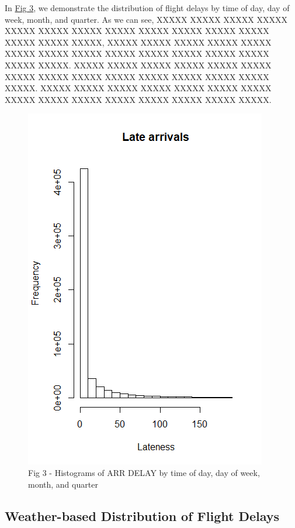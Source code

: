 \documentclass[12pt, a4paper]{book}
\newcommand\tab[1][1cm]{\hspace*{#1}}
\begin{document}
			\tab In \underline{Fig 3}, we demonstrate the distribution of flight delays by time of day, day of week, month, and quarter.  As we can see, XXXXX XXXXX XXXXX XXXXX XXXXX XXXXX XXXXX XXXXX XXXXX XXXXX XXXXX XXXXX XXXXX XXXXX XXXXX, XXXXX XXXXX XXXXX XXXXX XXXXX XXXXX XXXXX XXXXX XXXXX XXXXX XXXXX XXXXX XXXXX XXXXX XXXXX. XXXXX XXXXX XXXXX XXXXX XXXXX XXXXX XXXXX XXXXX XXXXX XXXXX XXXXX XXXXX XXXXX XXXXX XXXXX. XXXXX XXXXX XXXXX XXXXX XXXXX XXXXX XXXXX XXXXX XXXXX XXXXX XXXXX XXXXX XXXXX XXXXX XXXXX.
			\begin{figure}
			\centering
	 		\includegraphics[width = .45 \textwidth]{../figures/LateArrivalsHistogram}
	 		\caption{Fig 3 - Histograms of ARR DELAY by time of day, day of week, month, and quarter}
	 		\end{figure}
	 		
		\subsection{Weather-based Distribution of Flight Delays}
		
\end{document}
